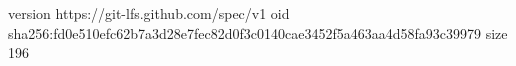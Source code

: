 version https://git-lfs.github.com/spec/v1
oid sha256:fd0e510efc62b7a3d28e7fec82d0f3c0140cae3452f5a463aa4d58fa93c39979
size 196
